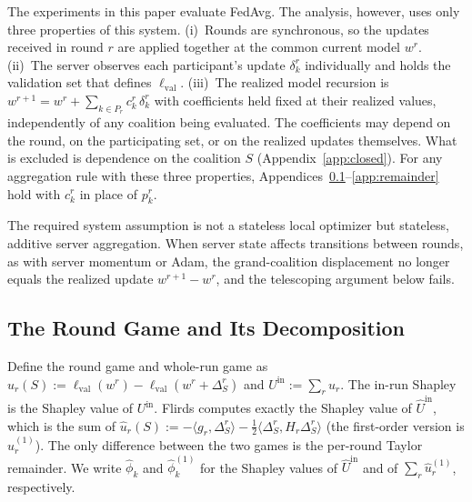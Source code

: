 \documentclass[letterpaper]{article} %
\providecommand{\lval}{\ell_{\mathrm{val}}}
\theoremstyle{definition}
\begin{document}
The experiments in this paper evaluate FedAvg. The analysis, however, uses
only three properties of this system. (i)~Rounds are synchronous, so the
updates received in round $r$ are applied together at the common current
model $w^r$. (ii)~The server observes each participant's update
$\delta_k^r$ individually and holds the validation set that defines
$\lval$. (iii)~The realized model recursion is
$w^{r+1} = w^r + \sum_{k \in P_r} c_k^r\, \delta_k^r$ with coefficients
held fixed at their realized values, independently of any coalition being
evaluated. The coefficients may
depend on the round, on the participating set, or on the realized updates
themselves. What is excluded is dependence on the coalition $S$
(Appendix~\ref{app:closed}). For any aggregation rule with these three
properties, Appendices~\ref{app:game}--\ref{app:remainder} hold with
$c_k^r$ in place of $p_k^r$.

The required system assumption is not a stateless local optimizer but
stateless, additive server aggregation. When server state affects transitions
between rounds, as with server momentum or Adam, the grand-coalition
displacement no longer equals the realized update $w^{r+1} - w^r$, and the
telescoping argument below fails.

\subsection{The Round Game and Its Decomposition}
\label{app:game}

Define the round game and whole-run game as
$u_r(S) := \lval(w^r) - \lval(w^r + \Delta_S^r)$ and
$U^{\mathrm{in}} := \sum_r u_r$. The in-run Shapley is the Shapley value of
$U^{\mathrm{in}}$. Flirds computes exactly the Shapley value of
$\hat U^{\mathrm{in}}$, which is the sum of
$\hat u_r(S) := -\langle g_r, \Delta_S^r\rangle
- \tfrac12\langle \Delta_S^r, H_r \Delta_S^r\rangle$
(the first-order version is $\hat u_r^{(1)}$). The only difference between
the two games is the per-round Taylor remainder. We write $\hat\phi_k$ and
$\hat\phi_k^{(1)}$ for the Shapley values of $\hat U^{\mathrm{in}}$ and of
$\sum_r \hat u_r^{(1)}$, respectively.
\end{document}
